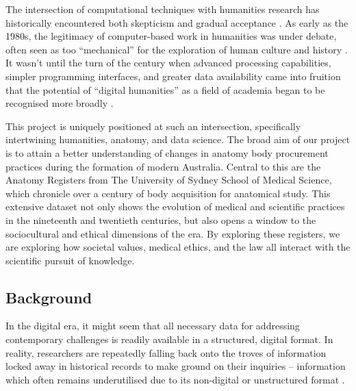 The intersection of computational techniques with humanities research has historically encountered both skepticism and gradual acceptance \parencite{macroanalysis_digital_humanities, big_data_history}. As early as the 1980s, the legitimacy of computer-based work in humanities was under debate, often seen as too ``mechanical'' for the exploration of human culture and history \parencite{olsen_1993, hockey_2004}. It wasn't until the turn of the century when advanced processing capabilities, simpler programming interfaces, and greater data availability came into fruition that the potential of ``digital humanities'' as a field of academia began to be recognised more broadly \parencite{dh_history}.

This project is uniquely positioned at such an intersection, specifically intertwining humanities, anatomy, and data science. The broad aim of our project is to attain a better understanding of changes in anatomy body procurement practices during the formation of modern Australia. Central to this are the Anatomy Registers from The University of Sydney School of Medical Science, which chronicle over a century of body acquisition for anatomical study. This extensive dataset not only shows the evolution of medical and scientific practices in the nineteenth and twentieth centuries, but also opens a window to the sociocultural and ethical dimensions of the era. By exploring these registers, we are exploring how societal values, medical ethics, and the law all interact with the scientific pursuit of knowledge.

\subsection{Background}

In the digital era, it might seem that all necessary data for addressing contemporary challenges is readily available in a structured, digital format. In reality, researchers are repeatedly falling back onto the troves of information locked away in historical records to make ground on their inquiries -- information which often remains underutilised due to its non-digital or unstructured format \parencite{big_data_history}.

